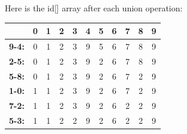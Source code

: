 \documentclass[paper=a4, fontsize=11pt]{scrartcl} %
\numberwithin{equation}{section} %
\numberwithin{figure}{section} %
\numberwithin{table}{section} %
\begin{document}
Here is the id[] array after each union operation:

\begin{table}[]
\centering
\label{my-label}
\begin{tabular}{c|cccccccccc}
\cline{2-11}
                                    & \multicolumn{1}{c|}{0} & \multicolumn{1}{c|}{1} & \multicolumn{1}{c|}{2} & \multicolumn{1}{c|}{3} & \multicolumn{1}{c|}{4} & \multicolumn{1}{c|}{5} & \multicolumn{1}{c|}{6} & \multicolumn{1}{c|}{7} & \multicolumn{1}{c|}{8} & \multicolumn{1}{c|}{9} \\ \hline
\multicolumn{1}{|c|}{\textbf{9-4:}} & 0                      & 1                      & 2                      & 3                      & 9                      & 5                      & 6                      & 7                      & 8                      & 9                      \\ \cline{1-1}
\multicolumn{1}{|c|}{\textbf{2-5:}} & 0                      & 1                      & 2                      & 3                      & 9                      & 2                      & 6                      & 7                      & 8                      & 9                      \\ \cline{1-1}
\multicolumn{1}{|c|}{\textbf{5-8:}} & 0                      & 1                      & 2                      & 3                      & 9                      & 2                      & 6                      & 7                      & 2                      & 9                      \\ \cline{1-1}
\multicolumn{1}{|c|}{\textbf{1-0:}} & 1                      & 1                      & 2                      & 3                      & 9                      & 2                      & 6                      & 7                      & 2                      & 9                      \\ \cline{1-1}
\multicolumn{1}{|c|}{\textbf{7-2:}} & 1                      & 1                      & 2                      & 3                      & 9                      & 2                      & 6                      & 2                      & 2                      & 9                      \\ \cline{1-1}
\multicolumn{1}{|c|}{\textbf{5-3:}} & 1                      & 1                      & 2                      & 2                      & 9                      & 2                      & 6                      & 2                      & 2                      & 9                      \\ \cline{1-1}

\end{tabular}
\end{table}
\end{document}
